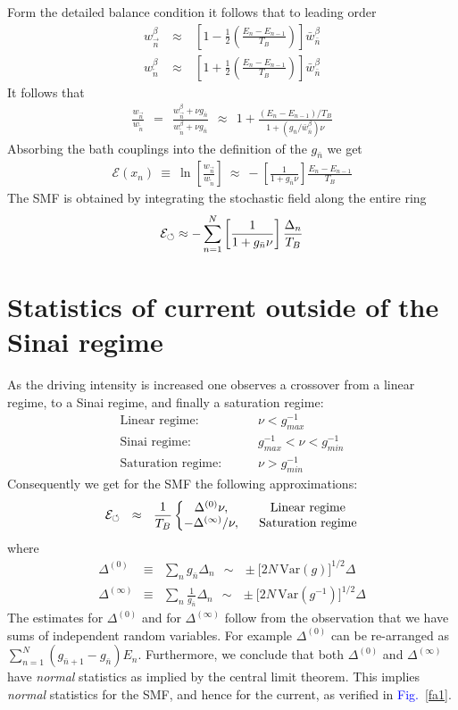 \documentclass[aps,prl,floats,floatfix,twocolumn]{revtex4}
\newcommand{\amatrix}[1]{\begin{matrix} #1 \end{matrix}}
\newcommand{\mylabel}[1]{\label{#1}}
\newcommand{\beq}{\begin{eqnarray}}
\newcommand{\eeq}{\end{eqnarray}}
\newcommand{\be}[1]{\begin{eqnarray}\ifthenelse{#1=-1}
{\nonumber}{\ifthenelse{#1=0}{}{\mylabel{e#1}}}}
\newcommand{\ee}{\end{eqnarray}}
\newcommand{\Fig}[1]{\textcolor{blue}{Fig.}\!\!~\ref{#1}}
\begin{document}
Form the detailed balance condition it follows that 
to leading order 
%
\beq
w^{\beta}_{\overrightarrow{n}} \ &\approx& \ \left[1-\frac{1}{2}\left(\frac{E_n-E_{n{-}1}}{T_B}\right)\right]\bar{w}_{\bar{n}}^{\beta} \\ 
w^{\beta}_{\overleftarrow{n}} \ &\approx& \ \left[1+\frac{1}{2}\left(\frac{E_n-E_{n{-}1}}{T_B}\right)\right]\bar{w}_{\bar{n}}^{\beta}
\eeq  
%
It follows that 
%
\beq
\frac{w_{\overrightarrow{n}}}{w_{\overleftarrow{n}}} 
\ \ = \ \ \frac{w^{\beta}_{\overrightarrow{n}}+\nu g_{\bar{n}}}{w^{\beta}_{\overleftarrow{n}}+\nu g_{\bar{n}}}
\ \ \approx \ \ 1+ \frac{(E_n-E_{n{-}1})/T_B}{1+(g_{\bar{n}}/\bar{w}_{\bar{n}}^{\beta})\nu}
\eeq
%
Absorbing the bath couplings into the definition of the $g_{\bar{n}}$ we get  
%
\beq
\mathcal{E}(x_n) \ \equiv \ \ln \left[\frac{w_{\overrightarrow{n}}}{w_{\overleftarrow{n}}}\right] 
\ \approx \ - \left[ \frac{1}{1+g_{\bar{n}}\nu} \right] \frac{E_n{-}E_{n{-}1}}{T_B}
\ee
%
The SMF is obtained by integrating the stochastic field along the entire ring 
%
\be{2001}
\mathcal{E}_{\circlearrowleft} 
\approx  -\sum_{n=1}^N \left[ \frac{1}{1+g_{\bar{n}}\nu} \right] \frac{\Delta_n}{T_B}
\eeq



\section{Statistics of current outside of the Sinai regime}

As the driving intensity is increased one observes a crossover from 
a linear regime, to a Sinai regime, and finally a saturation regime: 
% 
\beq
\text{Linear regime:}     & \ \ \ \ \ & \ \nu < g_{max}^{-1} \\
\text{Sinai regime:}      &&  \ g_{max}^{-1} < \nu < g_{min}^{-1}\\
\text{Saturation regime:} && \ \nu > g_{min}^{-1}
\eeq
%
Consequently we get for the SMF the following approximations: 
%
\be{131}
\mathcal{E}_{\circlearrowleft} \ \ \approx \ \ 
\frac{1}{T_B}
\left\{
\amatrix{
\Delta^{(0)}\nu, & \ \ \text{Linear regime} \cr 
-\Delta^{(\infty)}/\nu , & \ \ \text{Saturation regime}
}\right.
\eeq
%
where 
%
\beq
\Delta^{(0)} &\equiv&  \sum_{n} g_{\bar{n}}  \Delta_n 
\ \ \sim  \ \ \pm \Big[2N \, \mbox{Var}(g)\Big]^{1/2} \Delta
\\
\Delta^{(\infty)} &\equiv& \sum_{n} \frac{1}{g_{\bar{n}}}  \Delta_n
\ \ \sim \ \ \pm \Big[2N \, \mbox{Var}(g^{-1})\Big]^{1/2} \Delta
\eeq
%
The estimates for $\Delta^{(0)}$ and for $\Delta^{(\infty)}$
follow from the observation that we have sums of independent 
random variables. For example $\Delta^{(0)}$ can be re-arranged 
as ${\sum_{n=1}^{N} (g_{\bar{n}+1}-g_{\bar{n}}) E_n}$.
Furthermore, we conclude that both $\Delta^{(0)} $ and $\Delta^{(\infty)}$
have {\em normal} statistics as implied by the 
central limit theorem. This implies {\em normal} statistics 
for the SMF, and hence for the current, as verified in \Fig{fa1}.
\end{document}

